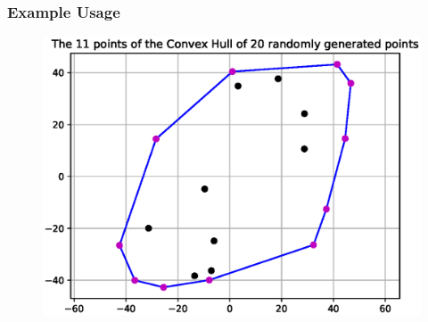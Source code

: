\documentclass[12pt]{article}
\newenvironment{matlab}
	{\begin{figure}[H]\centering\captionsetup{justification=centering}}
	{\end{figure}}
\begin{document}
\subsubsection*{Example Usage}

\begin{matlab}
    \includegraphics[scale=1]{images/gift_wrapping_algorithm.eps}
\end{matlab}

\pagebreak
\end{document}
